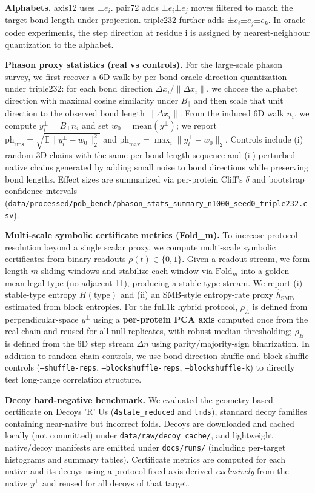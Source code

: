 \textbf{Alphabets.} axis12 uses ±$e_i$. pair72 adds ±$e_i$±$e_j$ moves filtered to match the target bond length under projection. triple232 further adds ±$e_i$±$e_j$±$e_k$. In oracle-codec experiments, the step direction at residue i is assigned by nearest-neighbour quantization to the alphabet.

\textbf{Phason proxy statistics (real vs controls).} For the large-scale phason survey, we first recover a 6D walk by per-bond oracle direction quantization under triple232: for each bond direction $\Delta x_i/\|\Delta x_i\|$, we choose the alphabet direction with maximal cosine similarity under $B_{\parallel}$ and then scale that unit direction to the observed bond length $\|\Delta x_i\|$. From the induced 6D walk $n_i$, we compute $y_i^{\perp}=B_{\perp}n_i$ and set $w_0=\mathrm{mean}(y^{\perp})$; we report $\mathrm{ph}_{\mathrm{rms}}=\sqrt{\mathbb{E}\|y_i^{\perp}-w_0\|_2^2}$ and $\mathrm{ph}_{\max}=\max_i\|y_i^{\perp}-w_0\|_2$. Controls include (i) random 3D chains with the same per-bond length sequence and (ii) perturbed-native chains generated by adding small noise to bond directions while preserving bond lengths. Effect sizes are summarized via per-protein Cliff's $\delta$ and bootstrap confidence intervals (\texttt{data/processed/pdb\_bench/phason\_stats\_summary\_n1000\_seed0\_triple232.csv}).

\textbf{Multi-scale symbolic certificate metrics (Fold\_m).} To increase protocol resolution beyond a single scalar proxy, we compute multi-scale symbolic certificates from binary readouts $\rho(t)\in\{0,1\}$. Given a readout stream, we form length-$m$ sliding windows and stabilize each window via $\mathrm{Fold}_m$ into a golden-mean legal type (no adjacent 11), producing a stable-type stream. We report (i) stable-type entropy $H(\mathrm{type})$ and (ii) an SMB-style entropy-rate proxy $\widehat{h}_{\mathrm{SMB}}$ estimated from block entropies. For the full1k hybrid protocol, $\rho_A$ is defined from perpendicular-space $y^\perp$ using a \textbf{per-protein PCA axis} computed once from the real chain and reused for all null replicates, with robust median thresholding; $\rho_B$ is defined from the 6D step stream $\Delta n$ using parity/majority-sign binarization. In addition to random-chain controls, we use bond-direction shuffle and block-shuffle controls (\texttt{--shuffle-reps}, \texttt{--blockshuffle-reps}, \texttt{--blockshuffle-k}) to directly test long-range correlation structure.

\textbf{Decoy hard-negative benchmark.} We evaluated the geometry-based certificate on Decoys 'R' Us (\texttt{4state\_reduced} and \texttt{lmds}), standard decoy families containing near-native but incorrect folds. Decoys are downloaded and cached locally (not committed) under \texttt{data/raw/decoy\_cache/}, and lightweight native/decoy manifests are emitted under \texttt{docs/runs/} (including per-target histograms and summary tables). Certificate metrics are computed for each native and its decoys using a protocol-fixed axis derived \emph{exclusively} from the native $y^\perp$ and reused for all decoys of that target.

